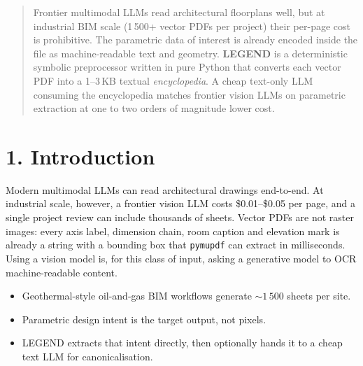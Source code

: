 \documentclass[a0,portrait]{a0poster}
\begin{document}
\begin{multicols}{2}

\color{NavyBlue}
\begin{abstract}
Frontier multimodal LLMs read architectural floorplans well, but at industrial
BIM scale (1\,500+ vector PDFs per project) their per-page cost is
prohibitive. The parametric data of interest is already encoded inside the
file as machine-readable text and geometry. \textbf{LEGEND} is a
deterministic symbolic preprocessor written in pure Python that converts
each vector PDF into a 1--3\,KB textual \emph{encyclopedia}. A cheap
text-only LLM consuming the encyclopedia matches frontier vision LLMs on
parametric extraction at one to two orders of magnitude lower cost.
\end{abstract}

\color{Black}

\section*{1. Introduction}
Modern multimodal LLMs can read architectural drawings end-to-end. At
industrial scale, however, a frontier vision LLM costs \$0.01--\$0.05 per
page, and a single project review can include thousands of sheets. Vector
PDFs are not raster images: every axis label, dimension chain, room caption
and elevation mark is already a string with a bounding box that
\texttt{pymupdf} can extract in milliseconds. Using a vision model is, for
this class of input, asking a generative model to OCR machine-readable
content.

\begin{itemize}
\item Geothermal-style oil-and-gas BIM workflows generate $\sim 1\,500$
sheets per site.
\item Parametric design intent is the target output, not pixels.
\item LEGEND extracts that intent directly, then optionally hands it to a
cheap text LLM for canonicalisation.
\end{itemize}


\end{multicols}
\end{document}
